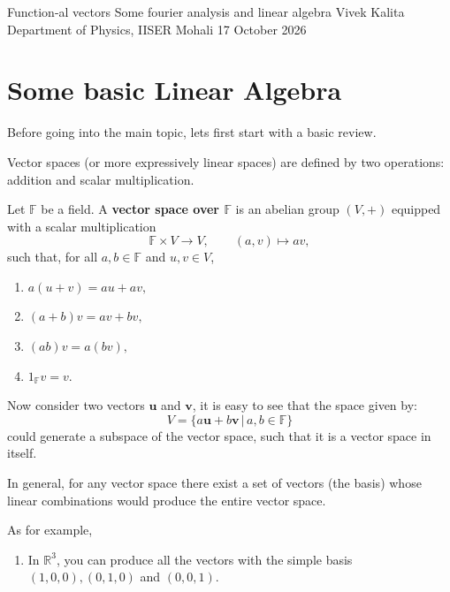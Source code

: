 \documentclass[10pt,a4paper]{article}
\begin{document}
\makemathtitle
    {Function-al vectors}
    {Some fourier analysis and linear algebra}
    {Vivek Kalita}
    {Department of Physics, IISER Mohali}
    {17 October 2026}

\tableofcontents

\section{Some basic Linear Algebra}
Before going into the main topic, lets first start with a basic review. 


Vector spaces (or more expressively linear spaces) are defined by two operations: addition and scalar multiplication. 

\begin{definition}
Let $\mathbb{F}$ be a field. A \textbf{vector space over $\mathbb{F}$}
is an abelian group $(V,+)$ equipped with a scalar multiplication
\[
\mathbb{F}\times V \longrightarrow V,
\qquad (a,v)\longmapsto av,
\]
such that, for all $a,b\in\mathbb{F}$ and $u,v\in V$,
\begin{enumerate}
    \item \(a(u+v) = au+av,\)
    \item \((a+b)v = av+bv,\)
    \item \((ab)v = a(bv),\)
    \item \(1_{\mathbb{F}}v = v.\)
\end{enumerate}
\end{definition}

Now consider two vectors \(\mathbf u\) and \(\mathbf v\), it is easy to see that the space given by:
\[
V = \{a \mathbf{u} + b \mathbf{v} \,|\, a,b \in \mathbb F\}
\]
could generate a subspace of the vector space, such that it is a vector space in itself. 

In general, for any vector space there exist a set of vectors (the basis) whose linear combinations would produce the entire vector space.

As for example, 
\begin{enumerate}
    \item In \(\mathbb R ^3\), you can produce all the vectors with the simple basis \((1,0,0), (0,1,0)\) and \((0,0,1)\).
\end{enumerate}
\end{document}
